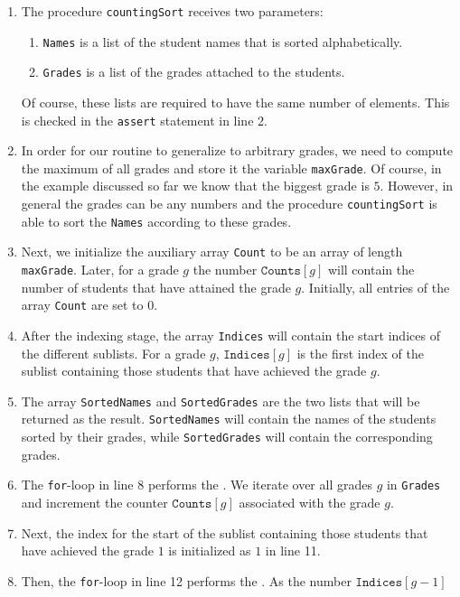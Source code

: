 \begin{enumerate}
\item The procedure \texttt{countingSort} receives two parameters:
      \begin{enumerate}
      \item \texttt{Names} is a list of the student names that is sorted alphabetically.
      \item \texttt{Grades} is a list of the grades attached to the students.
      \end{enumerate}
      Of course, these lists are required to have the same number of elements.  This is checked in the
      \texttt{assert} statement in line 2.
\item In order for our routine to generalize to arbitrary grades, we need to compute the maximum of all grades
      and store it the variable \texttt{maxGrade}.  Of course, in the example discussed so far we know that the biggest
      grade is $5$.  However, in general the grades can be any numbers and the procedure \texttt{countingSort}
      is able to sort the \texttt{Names} according to these grades.  
\item Next, we initialize the auxiliary array \texttt{Count} to be an array of length \texttt{maxGrade}.
      Later, for a grade $g$ the number $\texttt{Counts}[g]$ will contain the number of students that have
      attained the grade $g$.  Initially, all entries of the array \texttt{Count} are set to $0$.
\item After the indexing stage, the array \texttt{Indices} will contain the start indices of the different sublists.
      For a grade $g$, $\texttt{Indices}[g]$ is the first index of the sublist containing those students that
      have achieved the grade $g$.
\item The array \texttt{SortedNames} and \texttt{SortedGrades} are the two lists that will be returned as the
      result.  \texttt{SortedNames} will contain the names of the students sorted by their grades, while
      \texttt{SortedGrades} will contain the corresponding grades. 
\item The \texttt{for}-loop in line 8 performs the .  We iterate over all grades $g$ in
      \texttt{Grades} and increment the counter $\texttt{Counts}[g]$ associated with the grade $g$.
\item Next, the index for the start of the sublist containing those students that have achieved the grade $1$
      is initialized as $1$ in line 11. 
\item Then, the \texttt{for}-loop in line 12 performs the . As the number $\texttt{Indices}[g-1]$

\end{enumerate}
